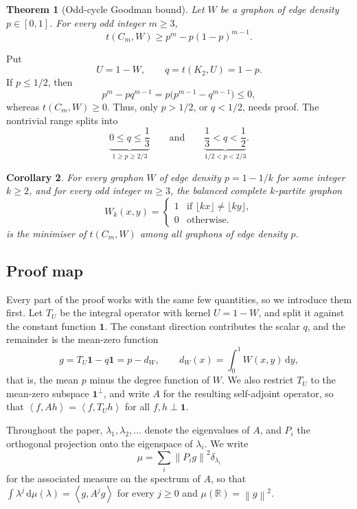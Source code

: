 ﻿\documentclass[11pt]{article}
\newtheorem{theorem}{Theorem}[section]
\newtheorem{corollary}[theorem]{Corollary}
\numberwithin{equation}{section}
\newcommand{\one}{\mathbf 1}
\newcommand{\R}{\mathbb R}
\newcommand{\ip}[2]{\left\langle #1,#2\right\rangle}
\newcommand{\norm}[1]{\left\lVert #1\right\rVert}
\newcommand{\dd}{\,\mathrm d}
\begin{document}
\begin{theorem}[Odd-cycle Goodman bound]\label{thm:main}
  Let $W$ be a graphon of edge density $p\in[0,1]$.
  For every odd integer $m\ge3$,
  \begin{equation}\label{eq:main-goal}
    t(C_m,W)\ge p^m-p(1-p)^{m-1}.
  \end{equation}
\end{theorem}

Put
\[
  U=1-W,\qquad q=t(K_2,U)=1-p.
\]
If $p\le1/2$, then
\[
  p^m-pq^{m-1}=p\bigl(p^{m-1}-q^{m-1}\bigr)\le0,
\]
whereas $t(C_m,W)\ge0$.
Thus, only $p>1/2$, or $q<1/2$, needs proof.
The nontrivial range splits into
\[
  \underbrace{0\le q\le\frac{1}{3}}_{1 \ge p\ge2/3}
  \qquad\text{and}\qquad
  \underbrace{\frac{1}{3}<q<\frac{1}{2}}_{1/2<p<2/3}.
\]

\begin{corollary} \label{cor:main}
  For every graphon $W$ of edge density $p = 1 - 1 / k$ for some integer $k \ge 2$, and for every odd integer $m \ge 3$, the balanced complete $k$-partite graphon
  \[
    W_k(x, y) = \begin{cases}
      1 & \text{if } \lfloor kx \rfloor \neq \lfloor ky \rfloor,
      \\
      0 & \text{otherwise}.
    \end{cases}
  \]
  is the minimiser of $t(C_m, W)$ among all graphons of edge density $p$.
\end{corollary}

\subsection{Proof map}

Every part of the proof works with the same few quantities, so we introduce them first.
Let $T_U$ be the integral operator with kernel $U=1-W$, and split it against the constant function $\one$.
The constant direction contributes the scalar $q$, and the remainder is the mean-zero function
\[
  g=T_U\one-q\one
  =p-d_W,\qquad d_W(x)=\int_0^1W(x,y)\dd y,
\]
that is, the mean $p$ minus the degree function of $W$.
We also restrict $T_U$ to the mean-zero subspace $\one^\perp$, and write $A$ for the resulting self-adjoint operator, so that $\ip f{Ah}=\ip f{T_Uh}$ for all $f,h\perp\one$.

Throughout the paper, $\lambda_1,\lambda_2,\ldots$ denote the eigenvalues of $A$, and $P_i$ the orthogonal projection onto the eigenspace of $\lambda_i$.
We write
\[
  \mu=\sum_i\norm{P_ig}^2\delta_{\lambda_i}
\]
for the associated measure on the spectrum of $A$, so that $\int\lambda^j\dd\mu(\lambda)=\ip g{A^jg}$ for every $j\ge0$ and $\mu(\R)=\norm g^2$.
\end{document}
